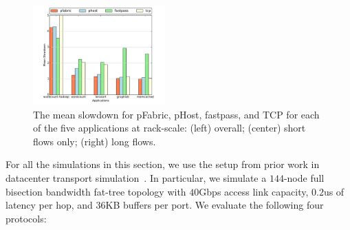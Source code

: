 %
\begin{figure}
  \centering
    \includegraphics[width = 2in]{img/fig12_raScale_slowdownsGraph} 
  \caption{\small{The mean slowdown for pFabric, pHost, fastpass, and TCP for each of the five applications at rack-scale: (left) overall; (center) short flows only; (right) long flows.}}
  \label{fig:phostp-rs}
\end{figure}
%
For all the simulations in this section, we use the setup from prior work in datacenter transport simulation~\cite{pfabric, phost}. In particular, we simulate a $144$-node full bisection bandwidth fat-tree topology with $40$Gbps access link capacity, $0.2$us of latency per hop, and $36$KB buffers per port. We evaluate the following four protocols:


